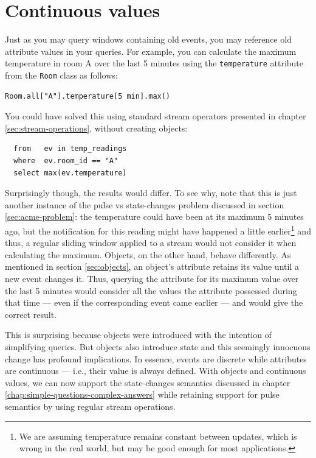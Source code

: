 \documentclass[a4,11pt]{report}
\begin{document}
\section{Continuous values}
\label{sec:continuous-values}

Just as you may query windows containing old events, you may reference
old attribute values in your queries. For example, you can calculate
the maximum temperature in room A over the last 5 minutes using the
\verb=temperature= attribute from the \verb=Room= class as follows:

\begin{verbatim}
Room.all["A"].temperature[5 min].max()
\end{verbatim}

You could have solved this using standard stream operators presented
in chapter \ref{sec:stream-operations}, without creating objects:

\begin{lstlisting}
  from   ev in temp_readings
  where  ev.room_id == "A"
  select max(ev.temperature)
\end{lstlisting}

Surprisingly though, the results would differ. To see why, note that
this is just another instance of the pulse vs state-changes problem
discussed in section \ref{sec:acme-problem}: the temperature could
have been at its maximum 5 minutes ago, but the notification for this
reading might have happened a little earlier\footnote{We are assuming
  temperature remains constant between updates, which is wrong in the
  real world, but may be good enough for most applications.} and thus,
a regular sliding window applied to a stream would not consider it
when calculating the maximum. Objects, on the other hand, behave
differently. As mentioned in section \ref{sec:objects}, an object's
attribute retains its value until a new event changes it. Thus,
querying the attribute for its maximum value over the last 5 minutes
would consider all the values the attribute possessed during that time
--- even if the corresponding event came earlier --- and would give
the correct result.

This is surprising because objects were introduced with the intention
of simplifying queries. But objects also introduce state and this
seemingly innocuous change has profound implications. In essence,
events are discrete while attributes are continuous --- i.e., their
value is always defined. With objects and continuous values, we can
now support the state-changes semantics discussed in chapter
\ref{chap:simple-questions-complex-answers} while retaining support
for pulse semantics by using regular stream operations.
\end{document}
